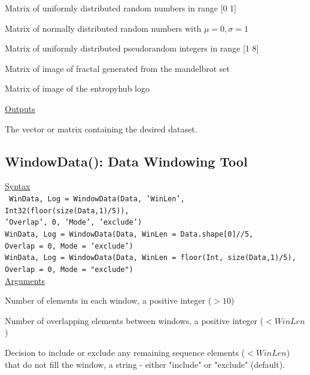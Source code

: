 \documentclass[12pt, a4paper, titlepage, openany]{book}
\begin{document}
\begin{description}[labelsep=1cm, labelwidth=2cm, nosep,,style=multiline,leftmargin=3cm]
\begin{description}[labelsep=1cm, labelwidth=4cm, nosep,style=multiline,leftmargin=4cm]
\item[\texttt{'uniform\textunderscore Mat'}]  Matrix of uniformly distributed random numbers in range [0 1]
\item[\texttt{'gaussian\textunderscore Mat'}] Matrix of normally distributed random numbers with $\mu = 0, \sigma = 1$
\item[\texttt{'randintegers\textunderscore Mat'}] Matrix of uniformly distributed pseudorandom integers in range [1 8]
\item[\texttt{'mandelbrot\textunderscore Mat'}] Matrix of image of fractal generated from the mandelbrot set
\item[\texttt{'entropyhub\textunderscore Mat'}]  Matrix of image of the entropyhub logo \\
\end{description}
\end{description}

\noindent \ul{Outputs}

\begin{description}[labelsep=1cm, labelwidth=4cm, nosep,style=multiline,leftmargin=3cm]\footnotesize
\item[\texttt{Data}]	The vector or matrix containing the desired dataset.
\end{description}





\newpage
\subsection{\normalsize WindowData():  Data Windowing Tool} \label{WindowData()}
\noindent\ul{Syntax} \vspace{6mm} \\ \noindent \texttt{\footnotesize
WinData, Log = WindowData(Data, 'WinLen', Int32(floor(size(Data,1)/5)), \\ \indent 'Overlap', 0, 'Mode', 'exclude')\\
WinData, Log = WindowData(Data, WinLen = Data.shape[0]//5, \\ \indent  Overlap = 0, Mode = 'exclude')\\
WinData, Log = WindowData(Data, WinLen = floor(Int, size(Data,1)/5), \\ \indent  Overlap = 0, Mode = "exclude")}\\

\noindent \ul{Arguments}
\begin{description}[labelsep=1cm, labelwidth=2cm, nosep,,style=multiline,leftmargin=3cm]\footnotesize
\item[\texttt{WinData}]	 Number of elements in each window, a positive integer ($>10$)
\item[\texttt{Overlap}]	 Number of overlapping elements between windows, a positive integer ($< WinLen$)
\item[\texttt{Mode}]	Decision to include or exclude any remaining sequence elements ($< WinLen$) that do not fill the window, a string - either "include" or "exclude" (default).
\end{description}
\end{document}

